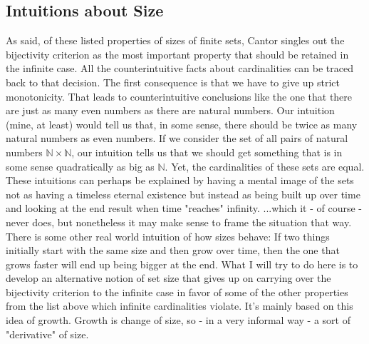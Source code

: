 \documentclass[12pt]{article}
\begin{document}
\subsection{Intuitions about Size}
As said, of these listed properties of sizes of finite sets, Cantor singles out the bijectivity criterion as the most important property that should be retained in the infinite case. All the counterintuitive facts about cardinalities can be traced back to that decision. The first consequence is that we have to give up strict monotonicity. That leads to counterintuitive conclusions like the one that there are just as many even numbers as there are natural numbers. Our intuition (mine, at least) would tell us that, in some sense, there should be twice as many natural numbers as even numbers. If we consider the set of all pairs of natural numbers $\mathbb{N} \times \mathbb{N}$, our intuition tells us that we should get something that is in some sense quadratically as big as $\mathbb{N}$. Yet, the cardinalities of these sets are equal. These intuitions can perhaps be explained by having a mental image of the sets not as having a timeless eternal existence but instead as being built up over time and looking at the end result when time "reaches" infinity. ...which it - of course - never does, but nonetheless it may make sense to frame the situation that way. There is some other real world intuition of how sizes behave: If two things initially start with the same size and then grow over time, then the one that grows faster will end up being bigger at the end. What I will try to do here is to develop an alternative notion of set size that gives up on carrying over the bijectivity criterion to the infinite case in favor of some of the other properties from the list above which infinite cardinalities violate. It's mainly based on this idea of growth. Growth is change of size, so - in a very informal way - a sort of "derivative" of size.


%

\end{document}
